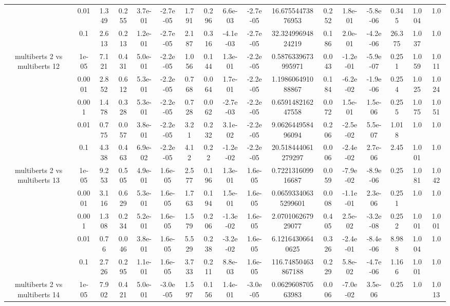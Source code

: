 \begin{tabular}{|c|c|c|c|c|c|c|c|c|c|c|c|c|c|c|c|c|}
 & 0.01 & 1.349 & 0.255 & 3.7e-01 & -2.7e-05 & 1.791 & 0.296 & 6.6e-03 & -2.7e-05 & 16.67554473876953 & 0.252 & 1.8e-01 & -5.8e-06 & 0.345 & 1.004 & 1.0 \\
 & 0.1 & 2.613 & 0.213 & 1.2e-01 & -2.7e-05 & 2.187 & 0.316 & -4.1e-03 & -2.7e-05 & 32.32499694824219 & 0.186 & 2.0e-01 & -4.2e-06 & 26.375 & 1.037 & 1.0 \\
\hline
\multirow{5}{*}{multiberts 2 vs multiberts 12} & 1e-05 & 7.121 & 0.431 & 5.0e-01 & -2.2e-05 & 1.056 & 0.144 & 1.3e-01 & -2.2e-05 & 0.5876339673995971 & 0.043 & -1.2e-01 & -5.9e-07 & 0.251 & 1.059 & 1.011 \\
 & 0.0001 & 2.852 & 0.612 & 5.3e-01 & -2.2e-05 & 0.768 & 0.064 & 1.7e-01 & -2.2e-05 & 1.198606491088867 & 0.184 & -6.2e-02 & -1.9e-06 & 0.254 & 1.025 & 1.024 \\
 & 0.001 & 1.478 & 0.328 & 5.3e-01 & -2.2e-05 & 0.728 & 0.062 & -2.7e-03 & -2.2e-05 & 0.659148216247558 & 0.072 & 1.5e-01 & 1.5e-06 & 0.255 & 1.075 & 1.051 \\
 & 0.01 & 0.775 & 0.057 & 3.8e-01 & -2.2e-05 & 3.21 & 0.232 & 3.1e-02 & -2.2e-05 & 9.062644958496094 & 0.206 & -2.5e-02 & 5.5e-07 & 1.018 & 1.0 & 1.0 \\
 & 0.1 & 4.338 & 0.463 & 6.9e-02 & -2.2e-05 & 4.12 & 0.22 & -1.2e-02 & -2.2e-05 & 20.518444061279297 & 0.006 & -2.4e-02 & 2.7e-06 & 2.45 & 1.001 & 1.0 \\
\hline
\multirow{5}{*}{multiberts 2 vs multiberts 13} & 1e-05 & 9.253 & 0.505 & 4.9e-01 & 1.6e-05 & 2.577 & 0.196 & 1.3e-01 & 1.6e-05 & 0.722131609916687 & 0.059 & -7.9e-02 & -8.9e-06 & 0.25 & 1.081 & 1.042 \\
 & 0.0001 & 3.116 & 0.629 & 5.3e-01 & 1.6e-05 & 1.763 & 0.194 & 1.5e-01 & 1.6e-05 & 0.06593340635299601 & 0.008 & -1.1e-01 & 2.3e-06 & 0.251 & 1.0 & 1.0 \\
 & 0.001 & 1.308 & 0.234 & 5.2e-01 & 1.6e-05 & 1.579 & 0.206 & -1.3e-02 & 1.6e-05 & 2.070106267929077 & 0.405 & 2.5e-02 & -3.2e-08 & 0.252 & 1.001 & 1.001 \\
 & 0.01 & 0.76 & 0.046 & 3.8e-01 & 1.6e-05 & 5.529 & 0.238 & -3.2e-02 & 1.6e-05 & 6.12164306640625 & 0.326 & -2.4e-01 & -8.4e-06 & 8.988 & 1.004 & 1.0 \\
 & 0.1 & 2.726 & 0.295 & 1.1e-01 & 1.6e-05 & 3.733 & 0.211 & 8.8e-03 & 1.6e-05 & 116.74850463867188 & 0.229 & 5.8e-02 & -4.7e-06 & 1.166 & 1.001 & 1.0 \\
\hline
\multirow{5}{*}{multiberts 2 vs multiberts 14} & 1e-05 & 7.902 & 0.421 & 5.0e-01 & -3.0e-05 & 1.597 & 0.156 & 1.4e-01 & -3.0e-05 & 0.062960870563983 & 0.006 & -7.0e-02 & 3.5e-06 & 0.25 & 1.0 & 1.013 \\

\end{tabular}
